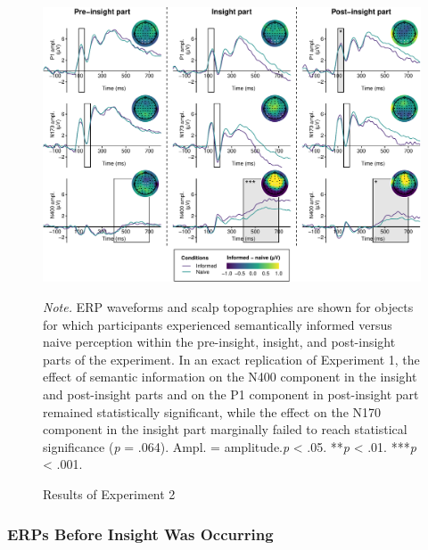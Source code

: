 \documentclass[
  english,
  doc,12pt,twoside,floatsintext]{apa7}
\begin{document}
\begin{figure}

\vspace*{15mm}

\caption{Results of Experiment 2\smallskip}\label{fig:exp2-plot}

{\centering \includegraphics[width=1\linewidth]{master_thesis_files/figure-latex/exp2-plot-1} 

}

\bigskip\small\textit{Note.} 
ERP waveforms and scalp topographies are shown for objects for which participants experienced semantically informed versus naive perception within the pre-insight, insight, and post-insight parts of the experiment. In an exact replication of Experiment 1, the effect of semantic information on the N400 component in the insight and post-insight parts and on the P1 component in post-insight part remained statistically significant, while the effect on the N170 component in the insight part marginally failed to reach statistical significance (\textit{p} = .064). Ampl. = amplitude.\newline*\textit{p} \textless{} .05. **\textit{p} \textless{} .01. ***\textit{p} \textless{} .001.

\end{figure}



\hypertarget{erps-before-insight-was-occurring-1}{%
\subsubsection{ERPs Before Insight Was Occurring}\label{erps-before-insight-was-occurring-1}}
\end{document}
